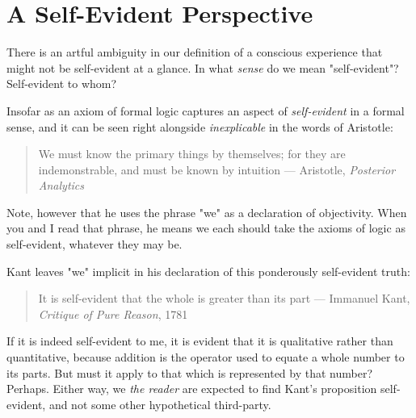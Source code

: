 \documentclass[runningheads]{llncs}
\begin{document}
\section{A Self-Evident Perspective}

There is an artful ambiguity in our definition of a conscious experience that might not be self-evident at a glance. In what \emph{sense} do we mean "self-evident"? Self-evident to whom? 

Insofar as an axiom of formal logic captures an aspect of \emph{self-evident} in a formal sense, and it can be seen right alongside \emph{inexplicable} in the words of Aristotle:

\begin{quote}
We must know the primary things by themselves; for they are indemonstrable, and must be known by intuition --- Aristotle, \emph{Posterior Analytics}
\end{quote}

Note, however that he uses the phrase "we" as a declaration of objectivity. When you and I read that phrase, he means we each should take the axioms of logic as self-evident, whatever they may be. 

Kant leaves "we" implicit in his declaration of this ponderously self-evident truth:

\begin{quote}
It is self-evident that the whole is greater than its part --- Immanuel Kant, \emph{Critique of Pure Reason}, 1781
\end{quote}

If it is indeed self-evident to me, it is evident that it is qualitative rather than quantitative, because addition is the operator used to equate a whole number to its parts. But must it apply to that which is represented by that number? Perhaps. Either way, we \emph{the reader} are expected to find Kant's proposition self-evident, and not some other hypothetical third-party. 
\end{document}
